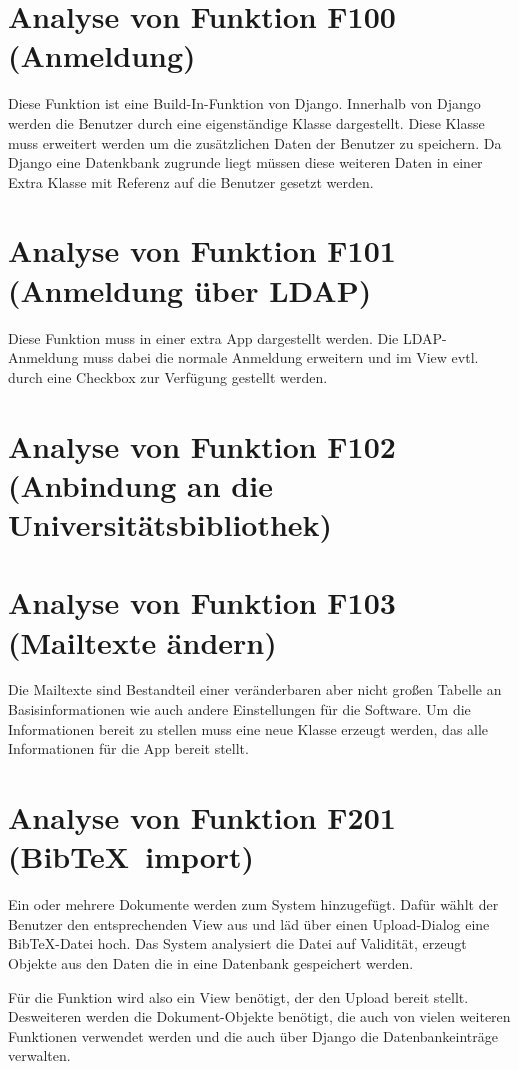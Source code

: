 \section{Analyse von Funktion F100 (Anmeldung)}
Diese Funktion ist eine Build-In-Funktion von Django. Innerhalb von Django
werden die Benutzer durch eine eigenständige Klasse dargestellt. Diese Klasse
muss erweitert werden um die zusätzlichen Daten der Benutzer zu speichern. Da
Django eine Datenkbank zugrunde liegt müssen diese weiteren Daten in einer Extra
Klasse mit Referenz auf die Benutzer gesetzt werden.

\section{Analyse von Funktion F101 (Anmeldung über LDAP)}
Diese Funktion muss in einer extra App dargestellt werden. Die LDAP-Anmeldung
muss dabei die normale Anmeldung erweitern und im View evtl. durch eine Checkbox
zur Verfügung gestellt werden.

\section{Analyse von Funktion F102 (Anbindung an die Universitätsbibliothek)}

\section{Analyse von Funktion F103 (Mailtexte ändern)}
Die Mailtexte sind Bestandteil einer veränderbaren aber nicht großen Tabelle an
Basisinformationen wie auch andere Einstellungen für die Software. Um die
Informationen bereit zu stellen muss eine neue Klasse erzeugt werden, das alle
Informationen für die App bereit stellt.

\section{Analyse von Funktion F201 (Bib\TeX\ import)}
Ein oder mehrere Dokumente werden zum System hinzugefügt. Dafür wählt der
Benutzer den entsprechenden View aus und läd über einen Upload-Dialog eine
Bib\TeX -Datei hoch. Das System analysiert die Datei auf Validität, erzeugt
Objekte aus den Daten die in eine Datenbank gespeichert werden.

Für die Funktion wird also ein View benötigt, der den Upload bereit stellt.
Desweiteren werden die Dokument-Objekte benötigt, die auch von vielen weiteren
Funktionen verwendet werden und die auch über Django die Datenbankeinträge
verwalten.
